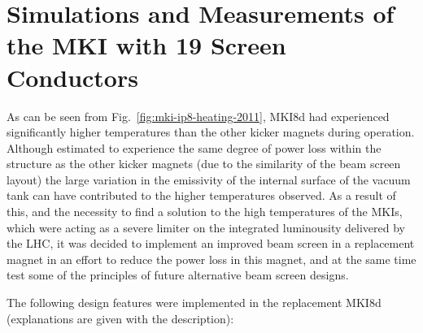 \section{Simulations and Measurements of the MKI with 19 Screen Conductors}

As can be seen from Fig.~\ref{fig:mki-ip8-heating-2011}, MKI8d had experienced significantly higher temperatures than the other kicker magnets during operation. Although estimated to experience the same degree of power loss within the structure as the other kicker magnets (due to the similarity of the beam screen layout) the large variation in the emissivity of the internal surface of the vacuum tank can have contributed to the higher temperatures observed. As a result of this, and the necessity to find a solution to the high temperatures of the MKIs, which were acting as a severe limiter on the integrated luminousity delivered by the LHC, it was decided to implement an improved beam screen in a replacement magnet in an effort to reduce the power loss in this magnet, and at the same time test some of the principles of future alternative beam screen designs.

The following design features were implemented in the replacement MKI8d (explanations are given with the description):

\begin{enumerate}

\end{enumerate}
